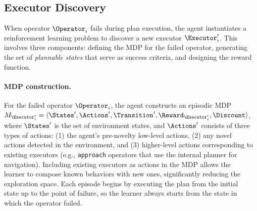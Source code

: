 \subsection{Executor Discovery}
\label{sec:executor_discovery_method}

When operator $\Operator_i$ fails during plan execution, the agent instantiates a reinforcement learning problem to discover a new executor $\Executor'_i$. This involves three components: defining the MDP for the failed operator, generating the set of \emph{plannable states} that serve as success criteria, and designing the reward function.

\paragraph{MDP construction.} For the failed operator $\Operator_i$, the agent constructs an episodic MDP $M_{\Executor'_i} = \langle \States', \Actions', \Transition', \Reward_{\Executor'_i}, \Discount \rangle$, where $\States'$ is the set of environment states, and $\Actions'$ consists of three types of actions: (1) the agent's pre-novelty low-level actions, (2) any novel actions detected in the environment, and (3) higher-level actions corresponding to existing executors (e.g., \texttt{approach} operators that use the internal planner for navigation). Including existing executors as actions in the MDP allows the learner to compose known behaviors with new ones, significantly reducing the exploration space. Each episode begins by executing the plan from the initial state up to the point of failure, so the learner always starts from the state in which the operator failed.

